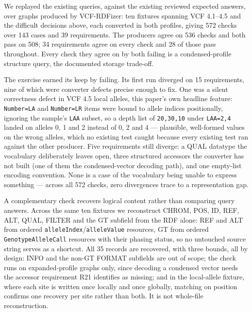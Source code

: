 \documentclass{ceurart}
\newcommand{\term}[1]{\texttt{#1}}
\begin{document}
We replayed the existing queries, against the existing reviewed expected answers, over graphs produced by VCF-RDFizer: ten fixtures spanning VCF 4.1--4.5 and the difficult decisions above, each converted in both profiles, giving 572 checks over 143 cases and 39 requirements. 
The producers agree on 536 checks and both pass on 508; 34 requirements agree on every check and 28 of those pass throughout. 
Every check they agree on by both failing is a condensed-profile structure query, the documented storage trade-off.

The exercise earned its keep by failing. 
Its first run diverged on 15 requirements, nine of which were converter defects precise enough to fix. 
One was a silent correctness defect in VCF 4.5 local alleles, this paper's own headline feature: \term{Number=LA} and \term{Number=LR} items were bound to allele indices positionally, ignoring the sample's \texttt{LAA} subset, so a depth list of \texttt{20,30,10} under \texttt{LAA=2,4} landed on alleles 0, 1 and 2 instead of 0, 2 and 4 --- plausible, well-formed values on the wrong alleles, which no existing test caught because every existing test ran against the other producer. 
Five requirements still diverge: a QUAL datatype the vocabulary deliberately leaves open, three structured accessors the converter has not built (one of them the condensed-vector decoding path), and one empty-list encoding convention. 
None is a case of the vocabulary being unable to express something --- across all 572 checks, zero divergences trace to a representation gap.

A complementary check recovers logical content rather than comparing query answers. 
Across the same ten fixtures we reconstruct CHROM, POS, ID, REF, ALT, QUAL, FILTER and the GT subfield from the RDF alone: REF and ALT from ordered \term{alleleIndex}/\term{alleleValue} resources, GT from ordered \term{GenotypeAlleleCall} resources with their phasing status, so no untouched source string serves as a shortcut. 
All 35 records are recovered, with three bounds, all by design: INFO and the non-GT FORMAT subfields are out of scope; the check runs on expanded-profile graphs only, since decoding a condensed vector needs the accessor requirement R21 identifies as missing; and in the local-allele fixture, where each site is written once locally and once globally, matching on position confirms one recovery per site rather than both. 
It is not whole-file reconstruction.
\end{document}
